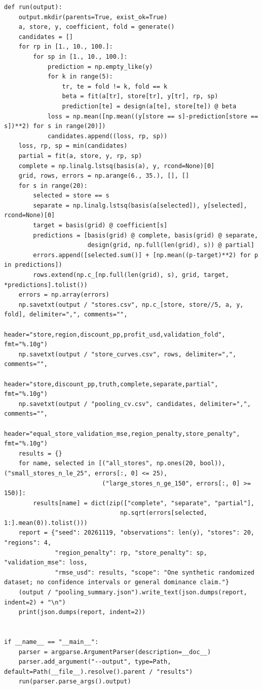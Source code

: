 \begin{Verbatim}[breaklines,breakanywhere,fontsize=\small]
def run(output):
    output.mkdir(parents=True, exist_ok=True)
    a, store, y, coefficient, fold = generate()
    candidates = []
    for rp in [1., 10., 100.]:
        for sp in [1., 10., 100.]:
            prediction = np.empty_like(y)
            for k in range(5):
                tr, te = fold != k, fold == k
                beta = fit(a[tr], store[tr], y[tr], rp, sp)
                prediction[te] = design(a[te], store[te]) @ beta
            loss = np.mean([np.mean((y[store == s]-prediction[store == s])**2) for s in range(20)])
            candidates.append((loss, rp, sp))
    loss, rp, sp = min(candidates)
    partial = fit(a, store, y, rp, sp)
    complete = np.linalg.lstsq(basis(a), y, rcond=None)[0]
    grid, rows, errors = np.arange(6., 35.), [], []
    for s in range(20):
        selected = store == s
        separate = np.linalg.lstsq(basis(a[selected]), y[selected], rcond=None)[0]
        target = basis(grid) @ coefficient[s]
        predictions = [basis(grid) @ complete, basis(grid) @ separate,
                       design(grid, np.full(len(grid), s)) @ partial]
        errors.append([selected.sum()] + [np.mean((p-target)**2) for p in predictions])
        rows.extend(np.c_[np.full(len(grid), s), grid, target, *predictions].tolist())
    errors = np.array(errors)
    np.savetxt(output / "stores.csv", np.c_[store, store//5, a, y, fold], delimiter=",", comments="",
               header="store,region,discount_pp,profit_usd,validation_fold", fmt="%.10g")
    np.savetxt(output / "store_curves.csv", rows, delimiter=",", comments="",
               header="store,discount_pp,truth,complete,separate,partial", fmt="%.10g")
    np.savetxt(output / "pooling_cv.csv", candidates, delimiter=",", comments="",
               header="equal_store_validation_mse,region_penalty,store_penalty", fmt="%.10g")
    results = {}
    for name, selected in [("all_stores", np.ones(20, bool)), ("small_stores_n_le_25", errors[:, 0] <= 25),
                           ("large_stores_n_ge_150", errors[:, 0] >= 150)]:
        results[name] = dict(zip(["complete", "separate", "partial"],
                                np.sqrt(errors[selected, 1:].mean(0)).tolist()))
    report = {"seed": 20261119, "observations": len(y), "stores": 20, "regions": 4,
              "region_penalty": rp, "store_penalty": sp, "validation_mse": loss,
              "rmse_usd": results, "scope": "One synthetic randomized dataset; no confidence intervals or general dominance claim."}
    (output / "pooling_summary.json").write_text(json.dumps(report, indent=2) + "\n")
    print(json.dumps(report, indent=2))


if __name__ == "__main__":
    parser = argparse.ArgumentParser(description=__doc__)
    parser.add_argument("--output", type=Path, default=Path(__file__).resolve().parent / "results")
    run(parser.parse_args().output)
\end{Verbatim}

